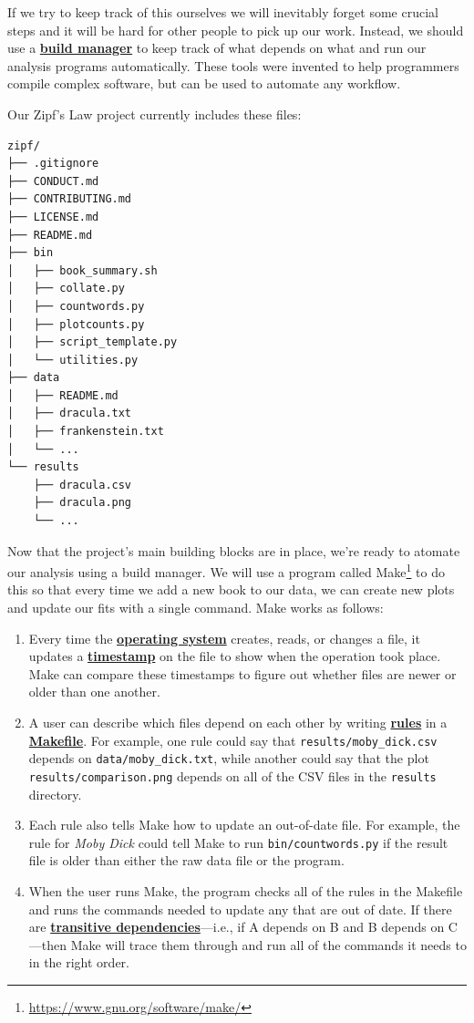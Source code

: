 \documentclass[
]{krantz}
\renewcommand{\href}[2]{#2\footnote{\url{#1}}}
\newcommand{\gref}[2]{\hyperlink{#2}{\textbf{#1}}}
\begin{document}
If we try to keep track of this ourselves
we will inevitably forget some crucial steps
and it will be hard for other people to pick up our work.
Instead,
we should use a \gref{build manager}{build\_manager}
to keep track of what depends on what
and run our analysis programs automatically.
These tools were invented to help programmers compile complex software,
but can be used to automate any workflow.

Our Zipf's Law project currently includes these files:

\begin{verbatim}
zipf/
├── .gitignore
├── CONDUCT.md
├── CONTRIBUTING.md
├── LICENSE.md
├── README.md
├── bin
│   ├── book_summary.sh
│   ├── collate.py
│   ├── countwords.py
│   ├── plotcounts.py
│   ├── script_template.py
│   └── utilities.py
├── data
│   ├── README.md
│   ├── dracula.txt
│   ├── frankenstein.txt
│   └── ...
└── results
    ├── dracula.csv
    ├── dracula.png
    └── ...
\end{verbatim}

Now that the project's main building blocks are in place,
we're ready to atomate our analysis using a build manager.
We will use a program called \href{https://www.gnu.org/software/make/}{Make} to do this
so that every time we add a new book to our data,
we can create new plots and update our fits with a single command.
Make works as follows:

\begin{enumerate}
\def\labelenumi{\arabic{enumi}.}
\item
  Every time the \gref{operating system}{operating\_system} creates, reads, or changes a file,
  it updates a \gref{timestamp}{timestamp} on the file to show when the operation took place.
  Make can compare these timestamps
  to figure out whether files are newer or older than one another.
\item
  A user can describe which files depend on each other
  by writing \gref{rules}{build\_rule} in a \gref{Makefile}{makefile}.
  For example,
  one rule could say that \texttt{results/moby\_dick.csv} depends on \texttt{data/moby\_dick.txt},
  while another could say that the plot \texttt{results/comparison.png}
  depends on all of the CSV files in the \texttt{results} directory.
\item
  Each rule also tells Make how to update an out-of-date file.
  For example,
  the rule for \emph{Moby Dick} could tell Make to run \texttt{bin/countwords.py}
  if the result file is older than either the raw data file or the program.
\item
  When the user runs Make,
  the program checks all of the rules in the Makefile
  and runs the commands needed to update any that are out of date.
  If there are \gref{transitive dependencies}{transitive\_dependency}---i.e.,
  if A depends on B and B depends on C---then Make will trace them through
  and run all of the commands it needs to in the right order.
\end{enumerate}
\end{document}
